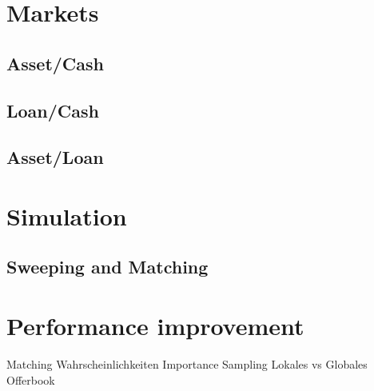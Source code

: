 \documentclass[Bachelorarbeit.tex]{subfiles}
\begin{document}
\section{Markets}
\subsection{Asset/Cash}
\subsection{Loan/Cash}
\subsection{Asset/Loan}

\section{Simulation}
\subsection{Sweeping and Matching}

\section{Performance improvement}
Matching Wahrscheinlichkeiten
Importance Sampling
Lokales vs Globales Offerbook
		
\end{document}
